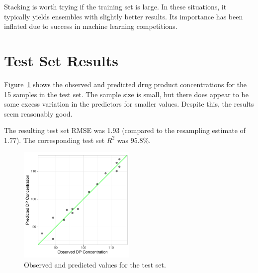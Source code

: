 \documentclass[
  letterpaper,
  DIV=11,
  numbers=noendperiod]{scrartcl}
\begin{document}
\begin{tcolorbox}[enhanced jigsaw, title=\textcolor{quarto-callout-important-color}{\faExclamation}\hspace{0.5em}{\textbf{WTF} \#13}, rightrule=.15mm, leftrule=.75mm, bottomtitle=1mm, opacityback=0, opacitybacktitle=0.6, bottomrule=.15mm, arc=.35mm, colframe=quarto-callout-important-color-frame, breakable, toprule=.15mm, toptitle=1mm, colback=white, titlerule=0mm, coltitle=black, left=2mm, colbacktitle=quarto-callout-important-color!10!white]

Stacking is worth trying if the training set is large. In these
situations, it typically yields ensembles with slightly better results.
Its importance has been inflated due to success in machine learning
competitions.

\end{tcolorbox}

\hypertarget{test-set-results}{%
\section{Test Set Results}\label{test-set-results}}

Figure~\ref{fig-test} shows the observed and predicted drug product
concentrations for the 15 samples in the test set. The sample size is
small, but there does appear to be some excess variation in the
predictors for smaller values. Despite this, the results seem reasonably
good.

The resulting test set RMSE was 1.93 (compared to the resampling
estimate of 1.77). The corresponding test set \(R^2\) was 95.8\%.

\begin{figure}[t!]

{\centering \includegraphics[width=0.5\textwidth,height=\textheight]{figures/fig-test-1.pdf}

}

\caption{\label{fig-test}Observed and predicted values for the test
set.}

\end{figure}
\end{document}
